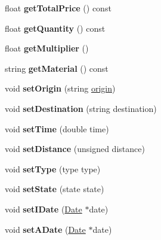 \begin{DoxyCompactItemize}
float {\bfseries get\+Total\+Price} () const
\item 
\mbox{\label{class_service_aceff76eb1aba00c9c74eb98d56771a6a}} 
float {\bfseries get\+Quantity} () const
\item 
\mbox{\label{class_service_a924ea5df81fa28e96b5ef02bad0d6d7f}} 
float {\bfseries get\+Multiplier} ()
\item 
\mbox{\label{class_service_a92be216e9c710b28bc4046353884b3e2}} 
string {\bfseries get\+Material} () const
\item 
\mbox{\label{class_service_a4a0b39f65bf93c6c4bb1f3ed46e09026}} 
void {\bfseries set\+Origin} (string \hyperlink{class_service_a0e23ac4930720ab597a5c584703151f9}{origin})
\item 
\mbox{\label{class_service_ac55887f707a51352588fd35d5b5361da}} 
void {\bfseries set\+Destination} (string destination)
\item 
\mbox{\label{class_service_aed76805ea044b29f0dafe65a7d39f2dc}} 
void {\bfseries set\+Time} (double time)
\item 
\mbox{\label{class_service_a6349774a4ab8afffe88dc51025690650}} 
void {\bfseries set\+Distance} (unsigned distance)
\item 
\mbox{\label{class_service_af26945add8ad6504432fa0c62c8c2769}} 
void {\bfseries set\+Type} (type type)
\item 
\mbox{\label{class_service_a7aa57d557be113ce2025843cb1046137}} 
void {\bfseries set\+State} (state state)
\item 
\mbox{\label{class_service_ac4635d11b13279a4ef84b1c6378639d4}} 
void {\bfseries set\+I\+Date} (\hyperlink{class_date}{Date} $\ast$date)
\item 
\mbox{\label{class_service_a80210953169ca04d454db8be48694187}} 
void {\bfseries set\+A\+Date} (\hyperlink{class_date}{Date} $\ast$date)
\item 
\mbox{\label{class_service_a1cf3d0b85e44bd7ec58e4a12a7432aef}} 

\end{DoxyCompactItemize}

